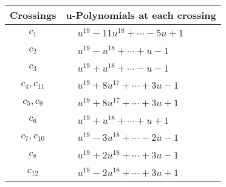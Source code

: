 \documentclass[1p]{elsarticle_modified}
\theoremstyle{definition}
\begin{document}
\begin{tabular}{m{50pt}|m{274pt}}
Crossings & \hspace{64pt}u-Polynomials at each crossing \\
\hline $$\begin{aligned}c_{1}\end{aligned}$$&$\begin{aligned}
&u^{19}-11 u^{18}+\cdots-5 u+1
\end{aligned}$\\
\hline $$\begin{aligned}c_{2}\end{aligned}$$&$\begin{aligned}
&u^{19}- u^{18}+\cdots+u-1
\end{aligned}$\\
\hline $$\begin{aligned}c_{3}\end{aligned}$$&$\begin{aligned}
&u^{19}+u^{18}+\cdots- u-1
\end{aligned}$\\
\hline $$\begin{aligned}c_{4},c_{11}\end{aligned}$$&$\begin{aligned}
&u^{19}+8 u^{17}+\cdots+3 u-1
\end{aligned}$\\
\hline $$\begin{aligned}c_{5},c_{9}\end{aligned}$$&$\begin{aligned}
&u^{19}+8 u^{17}+\cdots+3 u+1
\end{aligned}$\\
\hline $$\begin{aligned}c_{6}\end{aligned}$$&$\begin{aligned}
&u^{19}+u^{18}+\cdots+u+1
\end{aligned}$\\
\hline $$\begin{aligned}c_{7},c_{10}\end{aligned}$$&$\begin{aligned}
&u^{19}-3 u^{18}+\cdots-2 u-1
\end{aligned}$\\
\hline $$\begin{aligned}c_{8}\end{aligned}$$&$\begin{aligned}
&u^{19}+2 u^{18}+\cdots+3 u-1
\end{aligned}$\\
\hline $$\begin{aligned}c_{12}\end{aligned}$$&$\begin{aligned}
&u^{19}-2 u^{18}+\cdots+3 u+1
\end{aligned}$\\
\hline
\end{tabular}\\~\\
\end{document}
